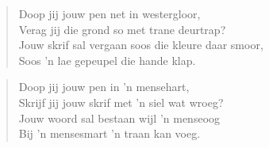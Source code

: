 \begin{verse}
Doop jij jouw pen net in westergloor, \\ 
Verag jij die grond so met trane deurtrap? \\ 
Jouw skrif sal vergaan soos die kleure daar smoor, \\ 
Soos ’n lae gepeupel die hande klap. \\ 
\end{verse}

\begin{verse}
Doop jij jouw pen in ’n mensehart, \\ 
Skrijf jij jouw skrif met ’n siel wat wroeg? \\ 
Jouw woord sal bestaan wijl ’n menseoog \\ 
Bij ’n mensesmart ’n traan kan voeg. \\ 
\end{verse}